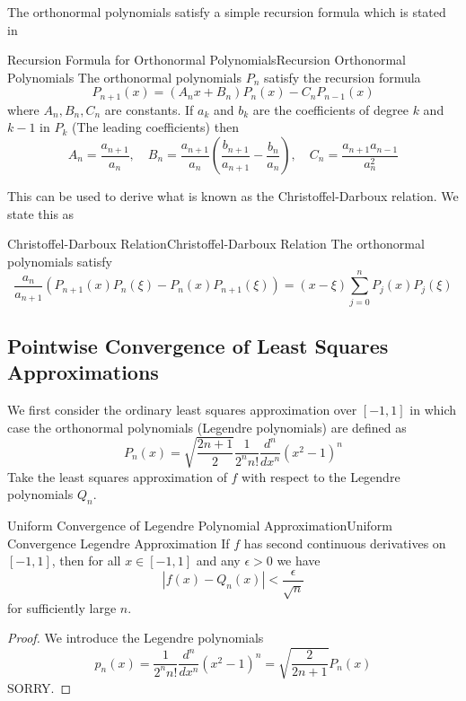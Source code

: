 \documentclass[../main.tex]{subfiles}
\begin{document}
The orthonormal polynomials satisfy a simple recursion formula which is stated in

\begin{theorem}{Recursion Formula for Orthonormal Polynomials}{Recursion Orthonormal Polynomials}
	The orthonormal polynomials $P_n$ satisfy the recursion formula
	\begin{equation}
		P_{n+1}(x) = (A_n x + B_n) P_n(x) - C_n P_{n-1}(x)
	\end{equation}
	where $A_n, B_n, C_n$ are constants. If $a_k$ and $b_k$ are the coefficients of degree $k$ and $k-1$ in $P_k$ (The leading coefficients) then
	\begin{equation}
		A_n = \frac{a_{n+1}}{a_n}, \quad B_n = \frac{a_{n+1}}{a_n} \left( \frac{b_{n+1}}{a_{n+1}} - \frac{b_n}{a_n} \right), \quad C_n = \frac{a_{n+1}a_{n-1}}{a_n^2}
	\end{equation}
\end{theorem}
This can be used to derive what is known as the Christoffel-Darboux relation. We state this as
\begin{theorem}{Christoffel-Darboux Relation}{Christoffel-Darboux Relation}
	The orthonormal polynomials satisfy
	\begin{equation}
		\frac{a_n}{a_{n+1}} (P_{n+1}(x) P_n(\xi) - P_n(x) P_{n+1}(\xi)) = (x-\xi) \sum_{j=0}^n P_j(x) P_j(\xi)
	\end{equation}
\end{theorem}

\subsection{Pointwise Convergence of Least Squares Approximations}
We first consider the ordinary least squares approximation over $[-1,1]$ in which case the orthonormal polynomials (Legendre polynomials) are defined as
\begin{equation}
	P_n(x) = \sqrt{\frac{2n+1}{2}} \frac{1}{2^n n!} \frac{d^n}{dx^n} (x^2 - 1)^n
\end{equation}
Take the least squares approximation of $f$ with respect to the Legendre polynomials $Q_n$.

\begin{theorem}{Uniform Convergence of Legendre Polynomial Approximation}{Uniform Convergence Legendre Approximation}
	If $f$ has second continuous derivatives on $[-1,1]$, then for all $x\in [-1,1]$ and any $\epsilon > 0$ we have
	\begin{equation}
		|f(x) - Q_n(x)| < \frac{\epsilon}{\sqrt{n}}
	\end{equation}
	for sufficiently large $n$.
\end{theorem}
\begin{proof}
	We introduce the Legendre polynomials
	\begin{equation*}
		p_n(x) = \frac{1}{2^n n!} \frac{d^n}{dx^n} (x^2 - 1)^n = \sqrt{\frac{2}{2n+1}} P_n(x)
	\end{equation*}
	SORRY.
\end{proof}
\end{document}
